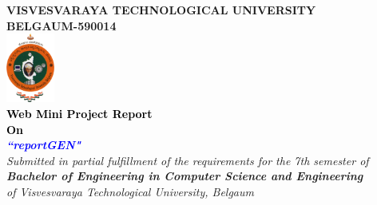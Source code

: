 \thispagestyle{empty}
\begin{titlepage}
\begin{center}
\textup{\large{\textcolor{darkbrown}{\bf VISVESVARAYA TECHNOLOGICAL UNIVERSITY} \\ {\textcolor{darkbrown}{\bf BELGAUM-590014}}}}\\
\includegraphics[width=0.12\textwidth]{./../static/media/VTU.png}\\
\textup{\small{\textcolor{black}{\textbf{Web Mini Project Report} \\ {\textbf{On}}}}} \\
\textup{\large{\textcolor{blue}{\textbf{\textit{``reportGEN"}}}}} \\[0.2in]

\textup{{\textit {Submitted in partial fulfillment of the requirements for the 7th semester of} \\ {\textbf {\textit {Bachelor of Engineering in Computer Science and Engineering}} \\ \textit {of Visvesvaraya Technological University, Belgaum}}}}\\


\end{center}
\end{titlepage}
